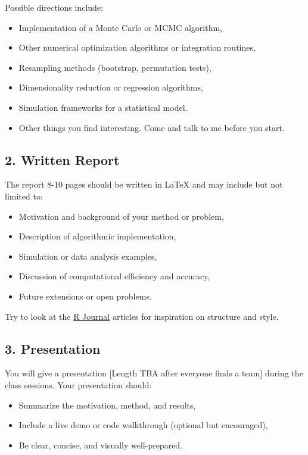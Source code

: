 \documentclass[
  letterpaper,
  DIV=11,
  numbers=noendperiod]{scrreprt}
\providecommand{\tightlist}{%
  \setlength{\itemsep}{0pt}\setlength{\parskip}{0pt}}
\begin{document}
Possible directions include:

\begin{itemize}
\tightlist
\item
  Implementation of a Monte Carlo or MCMC algorithm,
\item
  Other numerical optimization algorithms or integration routines,
\item
  Resampling methods (bootstrap, permutation tests),
\item
  Dimensionality reduction or regression algorithms,
\item
  Simulation frameworks for a statistical model.
\item
  Other things you find interesting. Come and talk to me before you
  start.
\end{itemize}

\subsection{2. Written Report}\label{written-report}

The report 8-10 pages should be written in LaTeX and may include but not
limited to:

\begin{itemize}
\tightlist
\item
  Motivation and background of your method or problem,
\item
  Description of algorithmic implementation,
\item
  Simulation or data analysis examples,
\item
  Discussion of computational efficiency and accuracy,
\item
  Future extensions or open problems.
\end{itemize}

Try to look at the \href{https://journal.r-project.org/}{R Journal}
articles for inspiration on structure and style.

\subsection{3. Presentation}\label{presentation}

You will give a presentation {[}Length TBA after everyone finds a
team{]} during the class sessions. Your presentation should:

\begin{itemize}
\tightlist
\item
  Summarize the motivation, method, and results,
\item
  Include a live demo or code walkthrough (optional but encouraged),
\item
  Be clear, concise, and visually well-prepared.
\end{itemize}
\end{document}
